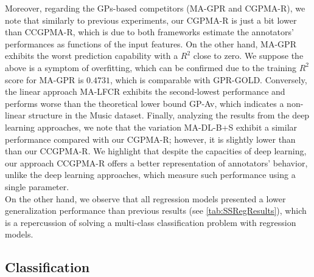 \documentclass[journal]{IEEEtran}
\begin{document}
Moreover, regarding the GPs-based competitors (MA-GPR and CGPMA-R), we note that similarly to previous experiments, our CGPMA-R is just a bit lower than CCGPMA-R, which is due to both frameworks estimate the annotators' performances as functions of the input features. On the other hand, MA-GPR exhibits the worst prediction capability with a $R^2$ close to zero. We suppose the above is a symptom of overfitting, which can be confirmed due to the training $R^2$ score for MA-GPR is $0.4731$, which is comparable with GPR-GOLD. Conversely, the linear approach MA-LFCR exhibits the second-lowest performance and performs worse than the theoretical lower bound GP-Av, which indicates a non-linear structure in the Music dataset. Finally, analyzing the results from the deep learning approaches, we note that the variation MA-DL-B+S exhibit a similar performance compared with our CGPMA-R; however, it is slightly lower than than our CCGPMA-R. We highlight that despite the capacities of deep learning, our approach CCGPMA-R offers a better representation of annotators' behavior, unlike the deep learning approaches, which measure such performance using a single parameter.\\
On the other hand, we observe that all regression models presented a lower generalization performance than previous results (see \cref{tab:SSRegResults}), which is a repercussion of solving a multi-class classification problem with regression models. 

\subsection{Classification}
\end{document}
